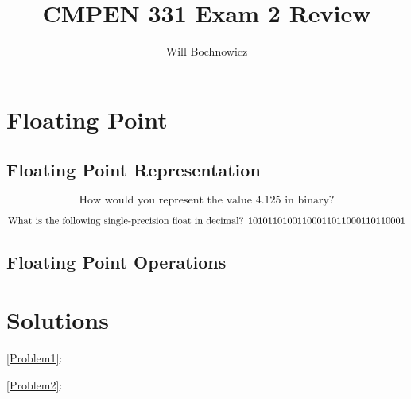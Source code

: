 \documentclass{article}
\title{CMPEN 331 Exam 2 Review}
\author{Will Bochnowicz}
\begin{document}
\maketitle

\section{Floating Point}

\subsection{Floating Point Representation}

\begin{equation}\label{Problem1}
    \text{How would you represent the value } 4.125 \text{ in binary?}
\end{equation}

\begin{equation}\label{Problem2}
    \text{What is the following single-precision float in decimal? } \\ 
    1 01011010 01100011011000110110001
\end{equation}

\subsection{Floating Point Operations}

\section{Solutions}

\ref{Problem1}: 

\ref{Problem2}:
\end{document}
